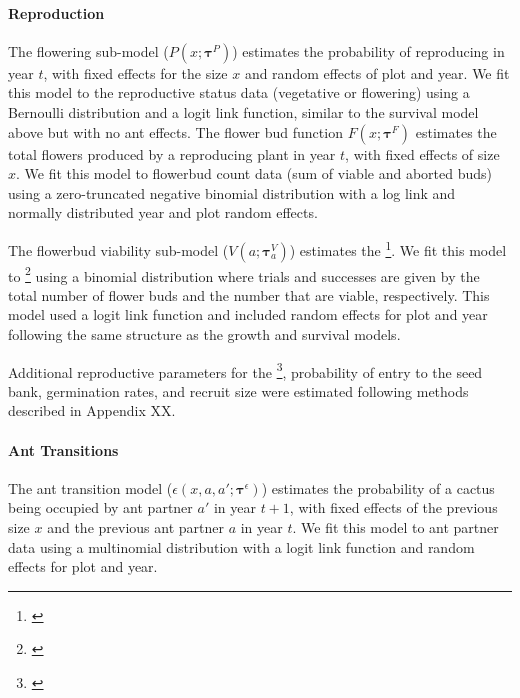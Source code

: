 \documentclass[11pt]{article}
\newcommand{\tom}[2]{{\color{red}{#1}}\footnote{\textit{\color{red}{#2}}}}
\begin{document}
\paragraph{Reproduction}
The flowering sub-model ($P(x;\pmb{\tau}^{P})$) estimates the probability of reproducing in year $t$, with fixed effects for the size $x$ and random effects of plot and year.
We fit this model to the reproductive status data (vegetative or flowering) using a Bernoulli distribution and a logit link function, similar to the survival model above but with no ant effects.  
The flower bud function $F(x;\pmb{\tau}^{F})$ estimates the total flowers produced by a reproducing plant in year $t$, with fixed effects of size $x$. 
We fit this model to flowerbud count data (sum of viable and aborted buds) using a zero-truncated negative binomial distribution with a log link and normally distributed year and plot random effects.

The flowerbud viability sub-model ($V(a;\pmb{\tau}^{V}_{a})$) estimates the \tom{proportion of flowers produced by a plant that are viable (not aborted) in year $t+1$, with fixed effects of ant partner $a$ in year $t$}{The way this is written here is not correct. Viability in year t should be a function of ants in year t. I would double check that this is what the model is actually doing.}.
We fit this model to \tom{floral abortion data}{The way this is written it's unclear whether you are modeling probability of viability or probability of abortion} using a binomial distribution where trials and successes are given by the total number of flower buds and the number that are viable, respectively.
This model used a logit link function and included random effects for plot and year following the same structure as the growth and survival models. 

Additional reproductive parameters for the \tom{number of seeds per fruit}{We need to briefly explain that this was any-specific, where those values come from, and how we deal with Other.}, probability of entry to the seed bank, germination rates, and recruit size were estimated following methods described in Appendix XX.

\paragraph{Ant Transitions}
The ant transition model ($\epsilon(x,a,a';\pmb{\tau}^{\epsilon})$) estimates the probability of a cactus being occupied by ant partner $a'$ in year $t+1$, with fixed effects of the previous size $x$  and the previous ant partner $a$  in year $t$.
We fit this model to ant partner data using a multinomial distribution with a logit link function and random effects for plot and year. 
\end{document}
